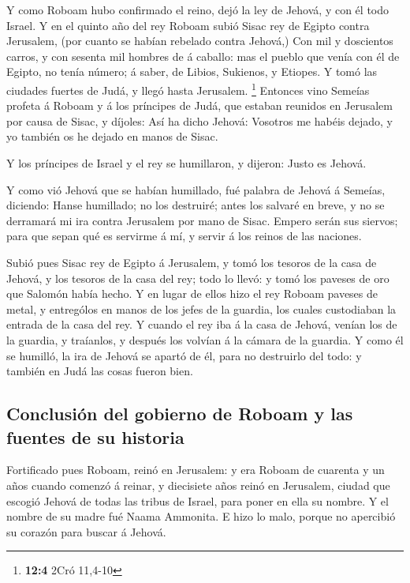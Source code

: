  Y como Roboam hubo confirmado el reino, dejó la ley de
Jehová, y con él todo Israel.  Y en el quinto año del rey
Roboam subió Sisac rey de Egipto contra Jerusalem, (por cuanto se habían
rebelado contra Jehová,)  Con mil y doscientos carros, y con
sesenta mil hombres de á caballo: mas el pueblo que venía con él de
Egipto, no tenía número; á saber, de Libios, Sukienos, y Etiopes.
 Y tomó las ciudades fuertes de Judá, y llegó hasta
Jerusalem. \footnote{\textbf{12:4} 2Cró 11,4-10}  Entonces
vino Semeías profeta á Roboam y á los príncipes de Judá, que estaban
reunidos en Jerusalem por causa de Sisac, y díjoles: Así ha dicho
Jehová: Vosotros me habéis dejado, y yo también os he dejado en manos de
Sisac.

 Y los príncipes de Israel y el rey se humillaron, y
dijeron: Justo es Jehová.

 Y como vió Jehová que se habían humillado, fué palabra de
Jehová á Semeías, diciendo: Hanse humillado; no los destruiré; antes los
salvaré en breve, y no se derramará mi ira contra Jerusalem por mano de
Sisac.  Empero serán sus siervos; para que sepan qué es
servirme á mí, y servir á los reinos de las naciones.

 Subió pues Sisac rey de Egipto á Jerusalem, y tomó los
tesoros de la casa de Jehová, y los tesoros de la casa del rey; todo lo
llevó: y tomó los paveses de oro que Salomón había hecho. 
Y en lugar de ellos hizo el rey Roboam paveses de metal, y entrególos en
manos de los jefes de la guardia, los cuales custodiaban la entrada de
la casa del rey.  Y cuando el rey iba á la casa de Jehová,
venían los de la guardia, y traíanlos, y después los volvían á la cámara
de la guardia.  Y como él se humilló, la ira de Jehová se
apartó de él, para no destruirlo del todo: y también en Judá las cosas
fueron bien.

\hypertarget{conclusiuxf3n-del-gobierno-de-roboam-y-las-fuentes-de-su-historia}{%
\subsection{Conclusión del gobierno de Roboam y las fuentes de su
historia}\label{conclusiuxf3n-del-gobierno-de-roboam-y-las-fuentes-de-su-historia}}

 Fortificado pues Roboam, reinó en Jerusalem: y era Roboam
de cuarenta y un años cuando comenzó á reinar, y diecisiete años reinó
en Jerusalem, ciudad que escogió Jehová de todas las tribus de Israel,
para poner en ella su nombre. Y el nombre de su madre fué Naama
Ammonita.  E hizo lo malo, porque no apercibió su corazón
para buscar á Jehová.

